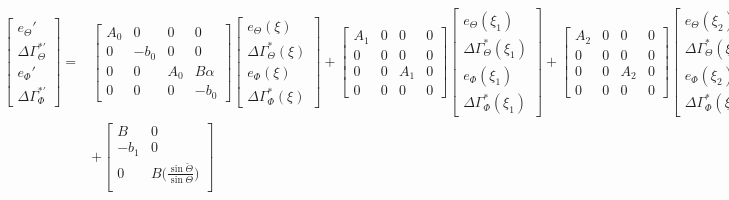 \documentclass[../main.tex]{subfiles}
\begin{document}
	 \begin{align}
	 \begin{bmatrix}
	 e_\Theta' \\
	 \Delta \Gamma_\Theta^{*'} \\
	 e_\Phi' \\
	 \Delta \Gamma_\Phi^{*'}
	 \end{bmatrix} =&
	 \begin{bmatrix}
	 A_0 & 0 & 0 & 0\\
	 0 & -b_0 & 0 & 0 \\
	 0 & 0 & A_0 & B \alpha \\
	 0 & 0 & 0 & -b_0
	 \end{bmatrix}
	 \begin{bmatrix}
	 e_\Theta(\xi) \\
	 \Delta \Gamma_\Theta^{*} (\xi) \\
	 e_\Phi(\xi) \\
	 \Delta \Gamma_\Phi^{*} (\xi) 
	 \end{bmatrix} + 
	 \begin{bmatrix}
	 A_1 & 0 & 0 & 0\\
	 0 & 0 & 0 & 0 \\
	 0 & 0 & A_1 & 0 \\
	 0 & 0 & 0 & 0 
	 \end{bmatrix}
	 \begin{bmatrix}
	 e_\Theta(\xi_1) \\
	 \Delta \Gamma_\Theta^{*} (\xi_1) \\
	 e_\Phi(\xi_1) \\
	 \Delta \Gamma_\Phi^{*} (\xi_1) 
	 \end{bmatrix} +
	 \begin{bmatrix}
	 A_2 & 0 & 0 & 0\\
	 0 & 0 & 0 & 0 \\
	 0 & 0 & A_2 & 0 \\
	 0 & 0 & 0 & 0 
	 \end{bmatrix}
	 \begin{bmatrix}
	 e_\Theta(\xi_2) \\
	 \Delta \Gamma_\Theta^{*} (\xi_2) \\
	 e_\Phi(\xi_2) \\
	 \Delta \Gamma_\Phi^{*} (\xi_2) 
	 \end{bmatrix} \nonumber\\
	 &+ \begin{bmatrix}
	 B & 0 \\
	 -b_1 & 0 \\
	 0 & B\bigg( \frac{\sin \check{\Theta}}{\sin \Theta}\bigg) \\

\end{bmatrix}
\end{align}
\end{document}
